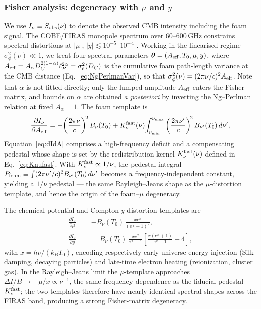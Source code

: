 \documentclass[aps,prd,onecolumn,amsmath,amssymb]{revtex4-2}
\begin{document}
\subsubsection{Fisher analysis: degeneracy with $\mu$ and $y$}
\label{sec:CMB_degeneracy}

We use $I_\nu\equiv S_{\rm obs}(\nu)$ to denote the observed CMB
intensity including the foam signal.
The COBE/FIRAS monopole spectrum over $60$--$600$\,GHz constrains
spectral distortions at $|\mu|,\,|y|\lesssim 10^{-5}$--$10^{-4}$
\cite{Fixsen1996}.  Working in the linearised regime
$\sigma_\phi^2(\nu)\ll 1$, we treat four spectral parameters
$\boldsymbol{\theta}=(A_{\rm eff},T_0,\mu,y)$, where
$A_{\rm eff}=A_\alpha D_C^{2(1-\alpha)}\ell_P^{2\alpha}=\sigma_\ell^2(D_C)$
is the cumulative foam path-length variance at the CMB distance
(Eq.~\eqref{eq:NgPerlmanVar}), so that
$\sigma_\phi^2(\nu)=(2\pi\nu/c)^2 A_{\rm eff}$.  Note that $\alpha$ is
not fitted directly; only the lumped amplitude $A_{\rm eff}$ enters
the Fisher matrix, and bounds on $\alpha$ are obtained
\emph{a posteriori} by inverting the Ng--Perlman relation at fixed
$A_\alpha=1$.  The
foam template is
\begin{equation}
  \frac{\partial I_\nu}{\partial A_{\rm eff}}
    = -\!\left(\frac{2\pi\nu}{c}\right)^{\!2} B_\nu(T_0)
      + K_\nu^{\rm fast}(\nu)\!\int_{\nu_{\rm min}}^{\nu_{\rm max}}
        \left(\frac{2\pi\nu'}{c}\right)^{\!2} B_{\nu'}(T_0)\,d\nu',
  \label{eq:dIdA}
\end{equation}
Equation~\eqref{eq:dIdA} comprises a high-frequency deficit and a
compensating pedestal whose shape is set by the redistribution
kernel $K_\nu^{\rm fast}(\nu)$ defined in
Eq.~\eqref{eq:Knufast}.  With $K_\nu^{\rm fast}\propto 1/\nu$, the
pedestal integral
$P_{\rm foam}\equiv\int(2\pi\nu'/c)^2 B_{\nu'}(T_0)\,d\nu'$ becomes a
frequency-independent constant, yielding a $1/\nu$ pedestal --- the
same Rayleigh--Jeans shape as the $\mu$-distortion template, and
hence the origin of the foam--$\mu$ degeneracy.

The chemical-potential and Compton-$y$ distortion templates are
\begin{align}
  \frac{\partial I_\nu}{\partial\mu}
    &= -B_\nu(T_0)\,\frac{x e^x}{(e^x-1)^2}, \label{eq:dIdmu}\\
  \frac{\partial I_\nu}{\partial y}
    &= \phantom{-}B_\nu(T_0)\,\frac{x e^x}{e^x-1}
       \!\left[\frac{x(e^x+1)}{e^x-1}-4\right], \label{eq:dIdy}
\end{align}
with $x=h\nu/(k_B T_0)$, encoding respectively early-universe energy
injection (Silk damping, decaying particles) and late-time electron
heating (reionization, cluster gas).  In the Rayleigh--Jeans limit the
$\mu$-template approaches $\Delta I/B\to -\mu/x\propto\nu^{-1}$, the
same frequency dependence as the fiducial pedestal $K_\nu^{\rm fast}$;
the two templates therefore have nearly identical spectral shapes
across the FIRAS band, producing a strong Fisher-matrix degeneracy.
\end{document}
